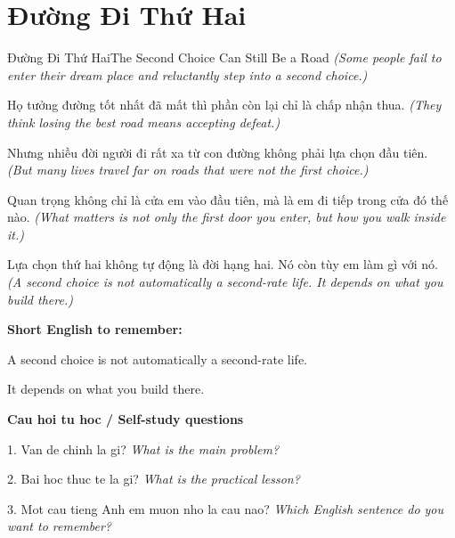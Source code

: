 \section{Đường Đi Thứ Hai}
\begin{truyen}{Đường Đi Thứ Hai}{The Second Choice Can Still Be a Road}
\textit{(Some people fail to enter their dream place and reluctantly step into a second choice.)}

Họ tưởng đường tốt nhất đã mất thì phần còn lại chỉ là chấp nhận thua.
\textit{(They think losing the best road means accepting defeat.)}

Nhưng nhiều đời người đi rất xa từ con đường không phải lựa chọn đầu tiên.
\textit{(But many lives travel far on roads that were not the first choice.)}

Quan trọng không chỉ là cửa em vào đầu tiên, mà là em đi tiếp trong cửa đó thế nào.
\textit{(What matters is not only the first door you enter, but how you walk inside it.)}

\end{truyen}

\begin{baihoc}
Lựa chọn thứ hai không tự động là đời hạng hai. Nó còn tùy em làm gì với nó.
\textit{(A second choice is not automatically a second-rate life. It depends on what you build there.)}
\end{baihoc}

\begin{ghinhoanh}
\textbf{Short English to remember:}

A second choice is not automatically a second-rate life.

It depends on what you build there.

\end{ghinhoanh}

\begin{tuhocnhanh}
\textbf{Cau hoi tu hoc / Self-study questions}

1. Van de chinh la gi? \textit{What is the main problem?}

2. Bai hoc thuc te la gi? \textit{What is the practical lesson?}

3. Mot cau tieng Anh em muon nho la cau nao? \textit{Which English sentence do you want to remember?}
\end{tuhocnhanh}
\ngancach

